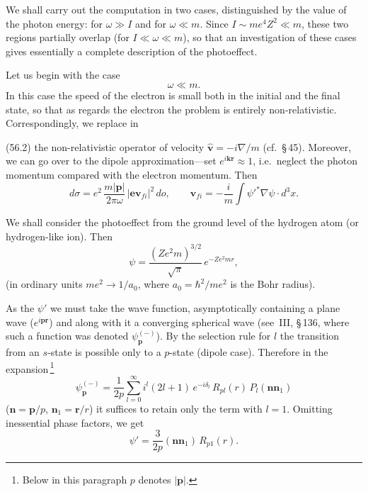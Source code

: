 We shall carry out the computation in two cases, distinguished by the value of the photon energy: for $\omega \gg I$ and for $\omega \ll m$. Since $I \sim me^4Z^2 \ll m$, these two regions partially overlap (for $I \ll \omega \ll m$), so that an investigation of these cases gives essentially a complete description of the photoeffect.

Let us begin with the case
\begin{equation}
\omega \ll m.
\tag{56.4}
\end{equation}
In this case the speed of the electron is small both in the initial and the final state, so that as regards the electron the problem is entirely non-relativistic. Correspondingly, we replace in

(56.2) the non-relativistic operator of velocity $\widehat{\mathbf{v}} = -i\nabla/m$ (cf.~\S\,45). Moreover, we can go over to the dipole approximation---set $e^{i\mathbf{k}\mathbf{r}} \approx 1$, i.e.\ neglect the photon momentum compared with the electron momentum. Then
\begin{equation}
d\sigma = e^2\,\frac{m|\mathbf{p}|}{2\pi\omega}\,|\mathbf{e}\mathbf{v}_{fi}|^2\,do,\qquad \mathbf{v}_{fi} = -\frac{i}{m}\int\psi'^*\nabla\psi\cdot d^3x.
\tag{56.5}
\end{equation}

We shall consider the photoeffect from the ground level of the hydrogen atom (or hydrogen-like ion). Then
\begin{equation}
\psi = \frac{(Ze^2m)^{3/2}}{\sqrt{\pi}}\,e^{-Ze^2mr},
\tag{56.6}
\end{equation}
(in ordinary units $me^2 \to 1/a_0$, where $a_0 = \hbar^2/me^2$ is the Bohr radius).

As the $\psi'$ we must take the wave function, asymptotically containing a plane wave ($e^{i\mathbf{p}\mathbf{r}}$) and along with it a converging spherical wave (see~III, \S\,136, where such a function was denoted $\psi^{(-)}_\mathbf{p}$). By the selection rule for $l$ the transition from an $s$-state is possible only to a $p$-state (dipole case). Therefore in the expansion\,\footnote{Below in this paragraph $p$ denotes $|\mathbf{p}|$.}
\begin{equation}
\psi^{(-)}_\mathbf{p} = \frac{1}{2p}\sum_{l=0}^{\infty}i^l(2l+1)\,e^{-i\delta_l}\,R_{pl}(r)\,P_l(\mathbf{nn}_1)
\tag{56.7}
\end{equation}
($\mathbf{n} = \mathbf{p}/p$, $\mathbf{n}_1 = \mathbf{r}/r$) it suffices to retain only the term with $l = 1$. Omitting inessential phase factors, we get
\begin{equation}
\psi' = \frac{3}{2p}(\mathbf{nn}_1)\,R_{p1}(r).
\tag{56.8}
\end{equation}

